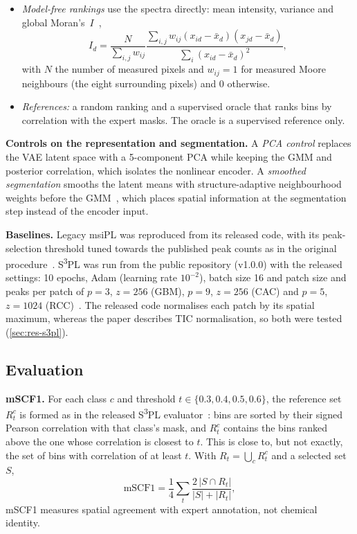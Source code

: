 \begin{itemize}
        score zero. It needs no gradients; this is the segment-then-correlate
        approach~\citep{alexandrov2010spatial}.
  \item \emph{Model-free rankings} use the spectra directly: mean intensity,
        variance and global Moran's~$I$~\citep{moran1950notes},
        \begin{equation}
        I_d=\frac{N}{\sum_{i,j}w_{ij}}
        \frac{\sum_{i,j}w_{ij}(x_{id}-\bar{x}_d)(x_{jd}-\bar{x}_d)}
        {\sum_i(x_{id}-\bar{x}_d)^2},
        \end{equation}
        with $N$ the number of measured pixels and $w_{ij}=1$ for measured Moore
        neighbours (the eight surrounding pixels) and 0 otherwise.
  \item \emph{References:} a random ranking and a supervised oracle that ranks
        bins by correlation with the expert masks. The oracle is a supervised reference only.
\end{itemize}

\textbf{Controls on the representation and segmentation.} A \emph{PCA control}
replaces the VAE latent space with a 5-component PCA while keeping the GMM and
posterior correlation, which isolates the nonlinear encoder. A \emph{smoothed
segmentation} smooths the latent means with structure-adaptive neighbourhood
weights before the GMM~\citep{alexandrov2011efficient}, which places spatial
information at the segmentation step instead of the encoder input.

\textbf{Baselines.} Legacy msiPL was reproduced from its released code, with
its peak-selection threshold tuned towards the published peak counts as in the
original procedure~\citep{abdelmoula2021peak}. S\textsuperscript{3}PL was run
from the public repository (v1.0.0) with the released settings: 10 epochs,
Adam (learning rate $10^{-2}$), batch size 16 and patch size and peaks per
patch of $p=3$, $z=256$ (GBM), $p=9$, $z=256$ (CAC) and $p=5$, $z=1024$
(RCC)~\citep{weigand2026spatial}. The released code normalises each patch by
its spatial maximum, whereas the paper describes TIC normalisation, so both
were tested (\cref{sec:res-s3pl}).

\subsection{Evaluation}
\label{sec:evaluation}
\textbf{mSCF1.} For each class $c$ and threshold $t\in\{0.3,0.4,0.5,0.6\}$,
the reference set $R^c_t$ is formed as in the released
S\textsuperscript{3}PL evaluator~\citep{weigand2026spatial}: bins are sorted by
their signed Pearson correlation with that class's mask, and $R^c_t$ contains
the bins ranked above the one whose correlation is closest to $t$. This is
close to, but not exactly, the set of bins with correlation of at least $t$. With $R_t=\bigcup_c R^c_t$ and a
selected set $S$,
\begin{equation}
\mathrm{mSCF1}=\frac{1}{4}\sum_{t}\frac{2\,|S\cap R_t|}{|S|+|R_t|},
\end{equation}
mSCF1 measures spatial agreement with expert annotation, not chemical
identity.


